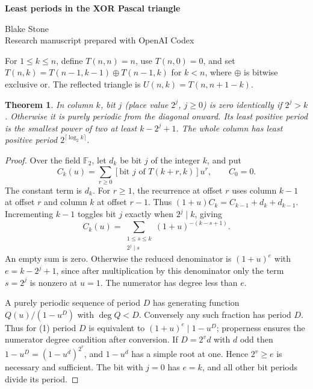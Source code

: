 \documentclass[11pt,letterpaper]{article}
\newtheorem{theorem}{Theorem}
\begin{document}
\thispagestyle{plain}
\begin{center}
{\LARGE\bfseries Least periods in the XOR Pascal triangle\par}
\vspace{0.5em}
Blake Stone\\
{\small Research manuscript prepared with OpenAI Codex}
\end{center}

\begin{abstract}
We determine the least period of every column and every active bit of the XOR triangle with diagonal \(1,2,3,\ldots\). A binomial formula also gives the complete rows at powers of two and the translated copies in the reflected triangle. These results prove the assertions of Franklin T. Adams-Watters in OEIS A195915 and A195916.
\end{abstract}
For \(1\le k\le n\), define \(T(n,n)=n\), use \(T(n,0)=0\), and set
\(T(n,k)=T(n-1,k-1)\mathbin{\oplus} T(n-1,k)\) for \(k<n\), where \(\oplus\) is bitwise exclusive or. The reflected triangle is \(U(n,k)=T(n,n+1-k)\).

\begin{theorem}\label{th:period}
In column \(k\), bit \(j\) (place value \(2^j\), \(j\ge0\)) is zero identically if \(2^j>k\). Otherwise it is purely periodic from the diagonal onward. Its least positive period is the smallest power of two at least \(k-2^j+1\). The whole column has least positive period \(2^{\lceil\log_2 k\rceil}\).
\end{theorem}
\begin{proof}
Over the field \(\mathbb F_2\), let \(d_k\) be bit \(j\) of the integer \(k\), and put
\[
 C_k(u)=\sum_{r\ge0} [\text{bit }j\text{ of }T(k+r,k)]u^r,\qquad C_0=0.
\]
The constant term is \(d_k\). For \(r\ge1\), the recurrence at offset \(r\) uses column \(k-1\) at offset \(r\) and column \(k\) at offset \(r-1\). Thus
\((1+u)C_k=C_{k-1}+d_k+d_{k-1}\). Incrementing \(k-1\) toggles bit \(j\) exactly when \(2^j\mid k\), giving
\[
 C_k(u)=\sum_{\substack{1\le s\le k\\ 2^j\mid s}}(1+u)^{-(k-s+1)}. \tag{1}
\]
An empty sum is zero. Otherwise the reduced denominator is \((1+u)^e\) with \(e=k-2^j+1\), since after multiplication by this denominator only the term \(s=2^j\) is nonzero at \(u=1\). The numerator has degree less than \(e\).

A purely periodic sequence of period \(D\) has generating function \(Q(u)/(1-u^D)\) with \(\deg Q<D\). Conversely any such fraction has period \(D\). Thus for (1) period \(D\) is equivalent to \((1+u)^e\mid1-u^D\); properness ensures the numerator degree condition after conversion. If \(D=2^v d\) with \(d\) odd then \(1-u^D=(1-u^d)^{2^v}\), and \(1-u^d\) has a simple root at one. Hence \(2^v\ge e\) is necessary and sufficient. The bit with \(j=0\) has \(e=k\), and all other bit periods divide its period.
\end{proof}
\end{document}
